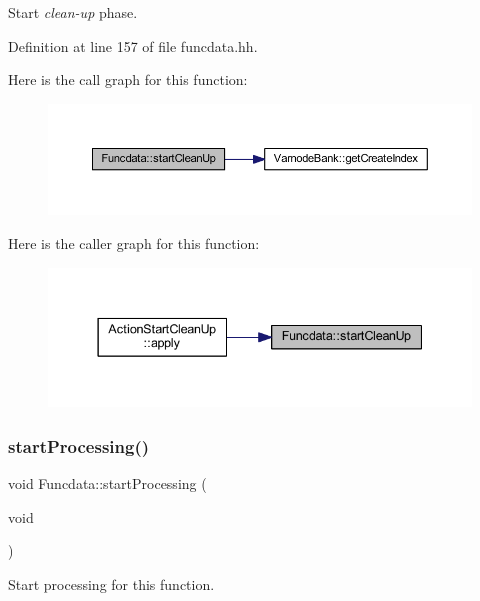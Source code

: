Start {\itshape clean-\/up} phase. 



Definition at line 157 of file funcdata.\+hh.

Here is the call graph for this function\+:
\nopagebreak
\begin{figure}[H]
\begin{center}
\leavevmode
\includegraphics[width=350pt]{class_funcdata_a29e446945c2081176890607173cbb461_cgraph}
\end{center}
\end{figure}
Here is the caller graph for this function\+:
\nopagebreak
\begin{figure}[H]
\begin{center}
\leavevmode
\includegraphics[width=337pt]{class_funcdata_a29e446945c2081176890607173cbb461_icgraph}
\end{center}
\end{figure}
\mbox{\label{class_funcdata_a0637a2c7f6a1e511284cfeecb4b0d475}} 
\subsubsection{\texorpdfstring{startProcessing()}{startProcessing()}}
{\footnotesize\ttfamily void Funcdata\+::start\+Processing (\begin{DoxyParamCaption}\item[{void}]{ }\end{DoxyParamCaption})}



Start processing for this function. 


